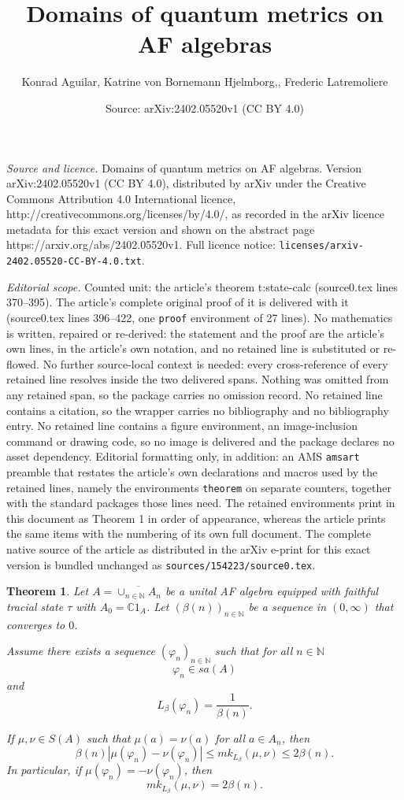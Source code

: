 \documentclass[10pt,a4paper]{amsart}
\title{Domains of quantum metrics on AF algebras}
\author{Konrad Aguilar, Katrine von Bornemann Hjelmborg,, Frederic Latremoliere}
\date{Source: arXiv:2402.05520v1 (CC BY 4.0)}
\newtheorem{theorem}{Theorem}
\newcommand{\C}{{\mathds{C}}}
\newcommand{\N}{{\mathds{N}}}
\renewcommand{\leq}{\leqslant}
\newcommand{\ninn}{n \in \N}
\newcommand{\vhi}{{\varphi}}
\begin{document}
\maketitle

\noindent\emph{Source and licence.} Domains of quantum metrics on AF algebras. Version arXiv:2402.05520v1 (CC BY 4.0), distributed by arXiv under the Creative Commons Attribution 4.0 International licence, http://creativecommons.org/licenses/by/4.0/, as recorded in the arXiv licence metadata for this exact version and shown on the abstract page https://arxiv.org/abs/2402.05520v1. Full licence notice: \texttt{licenses/arxiv-2402.05520-CC-BY-4.0.txt}.\par\smallskip

\noindent\textit{Editorial scope.} Counted unit: the article's theorem t:state-calc (source0.tex lines 370--395). The article's complete original proof of it is delivered with it (source0.tex lines 396--422, one \texttt{proof} environment of 27 lines). No mathematics is written, repaired or re-derived: the statement and the proof are the article's own lines, in the article's own notation, and no retained line is substituted or re-flowed.  No further source-local context is needed: every cross-reference of every retained line resolves inside the two delivered spans.  Nothing was omitted from any retained span, so the package carries no omission record.  No retained line contains a citation, so the wrapper carries no bibliography and no bibliography entry.  No retained line contains a figure environment, an image-inclusion command or drawing code, so no image is delivered and the package declares no asset dependency.  Editorial formatting only, in addition: an AMS \texttt{amsart} preamble that restates the article's own declarations and macros used by the retained lines, namely the environments \texttt{theorem} on separate counters, together with the standard packages those lines need.  The retained environments print in this document as Theorem 1 in order of appearance, whereas the article prints the same items with the numbering of its own full document.  The complete native source of the article as distributed in the arXiv e-print for this exact version is bundled unchanged as \texttt{sources/154223/source0.tex}.
\begin{theorem}\label{t:state-calc}
Let $A=\overline{\cup_{\ninn}A_n}$ be a unital AF algebra equipped with faithful tracial state $\tau$ with $A_0=\C1_A$. Let $(\beta(n))_{n \in \N}$ be a sequence in $(0,\infty)$ that converges to $0$.   


Assume there exists a sequence $(\vhi_n)_{\ninn}$ such that for all $\ninn$
\[
\vhi_n \in sa(A)
\]
and
\[
L_\beta(\vhi_n)=\frac{1}{\beta(n)}.
\]



If $\mu, \nu \in S(A)$ such that $\mu(a)=\nu(a)$ for all $a \in A_n$, then 
\[
\beta(n)|\mu(\vhi_n)-\nu(\vhi_n)|\leq mk_{L_\beta}(\mu, \nu) \leq 2 \beta(n).
\]
In particular, if $\mu(\vhi_n)=-\nu(\vhi_n)$, then 
\[
mk_{L_\beta}(\mu, \nu) = 2 \beta(n).
\]


\end{theorem}
\end{document}
